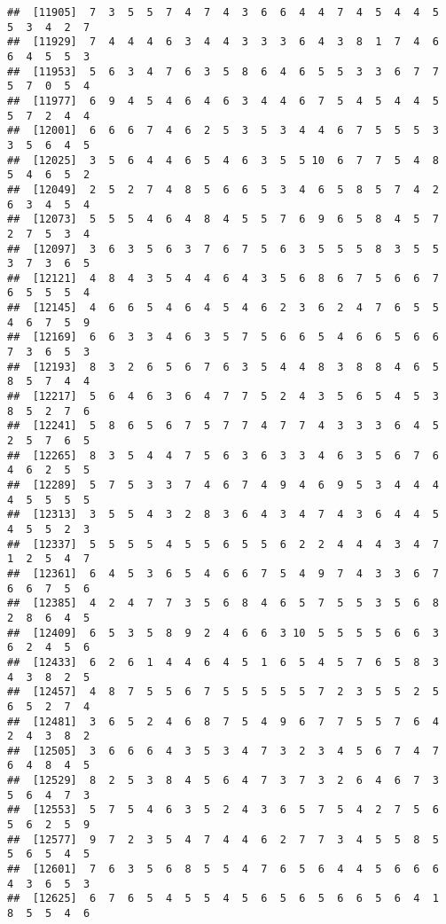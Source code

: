 \documentclass[
]{book}
\begin{document}
\begin{verbatim}
##  [11905]  7  3  5  5  7  4  7  4  3  6  6  4  4  7  4  5  4  4  5  5  3  4  2  7
##  [11929]  7  4  4  4  6  3  4  4  3  3  3  6  4  3  8  1  7  4  6  6  4  5  5  3
##  [11953]  5  6  3  4  7  6  3  5  8  6  4  6  5  5  3  3  6  7  7  5  7  0  5  4
##  [11977]  6  9  4  5  4  6  4  6  3  4  4  6  7  5  4  5  4  4  5  5  7  2  4  4
##  [12001]  6  6  6  7  4  6  2  5  3  5  3  4  4  6  7  5  5  5  3  3  5  6  4  5
##  [12025]  3  5  6  4  4  6  5  4  6  3  5  5 10  6  7  7  5  4  8  5  4  6  5  2
##  [12049]  2  5  2  7  4  8  5  6  6  5  3  4  6  5  8  5  7  4  2  6  3  4  5  4
##  [12073]  5  5  5  4  6  4  8  4  5  5  7  6  9  6  5  8  4  5  7  2  7  5  3  4
##  [12097]  3  6  3  5  6  3  7  6  7  5  6  3  5  5  5  8  3  5  5  3  7  3  6  5
##  [12121]  4  8  4  3  5  4  4  6  4  3  5  6  8  6  7  5  6  6  7  6  5  5  5  4
##  [12145]  4  6  6  5  4  6  4  5  4  6  2  3  6  2  4  7  6  5  5  4  6  7  5  9
##  [12169]  6  6  3  3  4  6  3  5  7  5  6  6  5  4  6  6  5  6  6  7  3  6  5  3
##  [12193]  8  3  2  6  5  6  7  6  3  5  4  4  8  3  8  8  4  6  5  8  5  7  4  4
##  [12217]  5  6  4  6  3  6  4  7  7  5  2  4  3  5  6  5  4  5  3  8  5  2  7  6
##  [12241]  5  8  6  5  6  7  5  7  7  4  7  7  4  3  3  3  6  4  5  2  5  7  6  5
##  [12265]  8  3  5  4  4  7  5  6  3  6  3  3  4  6  3  5  6  7  6  4  6  2  5  5
##  [12289]  5  7  5  3  3  7  4  6  7  4  9  4  6  9  5  3  4  4  4  4  5  5  5  5
##  [12313]  3  5  5  4  3  2  8  3  6  4  3  4  7  4  3  6  4  4  5  4  5  5  2  3
##  [12337]  5  5  5  5  4  5  5  6  5  5  6  2  2  4  4  4  3  4  7  1  2  5  4  7
##  [12361]  6  4  5  3  6  5  4  6  6  7  5  4  9  7  4  3  3  6  7  6  6  7  5  6
##  [12385]  4  2  4  7  7  3  5  6  8  4  6  5  7  5  5  3  5  6  8  2  8  6  4  5
##  [12409]  6  5  3  5  8  9  2  4  6  6  3 10  5  5  5  5  6  6  3  6  2  4  5  6
##  [12433]  6  2  6  1  4  4  6  4  5  1  6  5  4  5  7  6  5  8  3  4  3  8  2  5
##  [12457]  4  8  7  5  5  6  7  5  5  5  5  5  7  2  3  5  5  2  5  6  5  2  7  4
##  [12481]  3  6  5  2  4  6  8  7  5  4  9  6  7  7  5  5  7  6  4  2  4  3  8  2
##  [12505]  3  6  6  6  4  3  5  3  4  7  3  2  3  4  5  6  7  4  7  6  4  8  4  5
##  [12529]  8  2  5  3  8  4  5  6  4  7  3  7  3  2  6  4  6  7  3  5  6  4  7  3
##  [12553]  5  7  5  4  6  3  5  2  4  3  6  5  7  5  4  2  7  5  6  5  6  2  5  9
##  [12577]  9  7  2  3  5  4  7  4  4  6  2  7  7  3  4  5  5  8  5  5  6  5  4  5
##  [12601]  7  6  3  5  6  8  5  5  4  7  6  5  6  4  4  5  6  6  6  4  3  6  5  3
##  [12625]  6  7  6  5  4  5  5  4  5  6  5  6  5  6  6  5  6  4  1  8  5  5  4  6

\end{verbatim}
\end{document}

